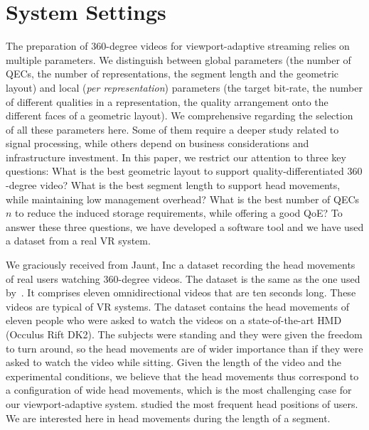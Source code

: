 \newcommand\testbitrateBudget{6}
\newcommand\testbitrateBudgetPercentage{\SI{75}{\percent}}
\section{System Settings}
\label{sec:settings}

The preparation of $360$-degree videos for viewport-adaptive streaming
relies on multiple parameters. We distinguish between global
parameters (the number of \acp{QEC}, the number of
representations, the segment length and the geometric layout)
and local (\emph{per representation}) parameters (the target bit-rate,
the number of different qualities in a representation, the quality
arrangement onto the different faces of a geometric layout). We  comprehensive regarding the selection of all these
parameters here. Some of them require a deeper study related to signal
processing, while others depend on business
considerations and infrastructure investment. In this paper, we
restrict our attention to three key questions: What is the best
geometric layout to support quality-differentiated $360$-degree video?
What is the best segment length to support head movements, while
maintaining low management overhead? What is the best number of
\acp{QEC} $n$ to reduce the induced storage requirements, while
offering a good \ac{QoE}? To answer these three questions, we have
developed a software tool and we have used a dataset from a real \ac{VR} system.


We graciously received from Jaunt, Inc a dataset
recording the head movements of real users watching $360$-degree videos.
The dataset is the same as the one used by~\citet{yu_framework_2015}. It comprises
eleven omnidirectional videos that are ten seconds long. These videos
are typical of \ac{VR} systems. The dataset contains
the head movements of eleven people who were asked to watch the videos
on a state-of-the-art \ac{HMD} (Occulus Rift DK2). The subjects were
standing and they were given the freedom to turn around, so the head
movements are of wider importance than if they were asked to watch the
video while sitting. Given the length of the video and the
experimental conditions, we believe that the head movements thus
correspond to a configuration of wide head movements, which
is the most challenging case for our viewport-adaptive
system. \citet{yu_framework_2015} studied the most frequent head
positions of users. We are interested here in head movements
during the length of a segment.

